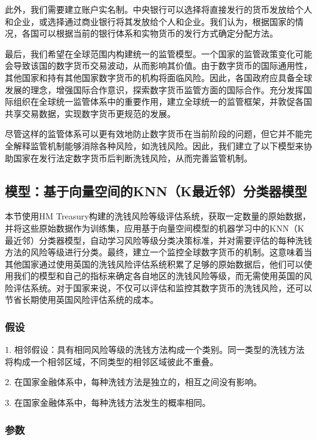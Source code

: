 \documentclass[withoutpreface,bwprint]{cumcmthesis} %
\begin{document}
此外，我们需要建立账户实名制。中央银行可以选择将直接发行的货币发放给个人和企业，或选择通过商业银行将其发放给个人和企业。我们认为，根据国家的情况，各国可以根据当前的银行体系和实物货币的发行方式确定分配方法。

最后，我们希望在全球范围内构建统一的监管模型。一个国家的监管政策变化可能会导致该国的数字货币交易波动，从而影响其价值。由于数字货币的国际通用性，其他国家和持有其他国家数字货币的机构将面临风险。因此，各国政府应具备全球发展的理念，增强国际合作意识，探索数字货币监管方面的国际合作。充分发挥国际组织在全球统一监管体系中的重要作用，建立全球统一的监管框架，并敦促各国共享交易数据，实现数字货币更规范的发展。

尽管这样的监管体系可以更有效地防止数字货币在当前阶段的问题，但它并不能完全解释监管机制能够消除各种风险，如洗钱风险。因此，我们建立了以下模型来协助国家在发行法定数字货币后判断洗钱风险，从而完善监管机制。

\subsection{模型：基于向量空间的KNN（K最近邻）分类器模型}
本节使用HM Treasury构建的洗钱风险等级评估系统，获取一定数量的原始数据，并将这些原始数据作为训练集，应用基于向量空间模型的机器学习中的KNN（K最近邻）分类器模型，自动学习风险等级分类决策标准，并对需要评估的每种洗钱方法的风险等级进行分类。最终，建立一个监控全球数字货币的机制。这意味着当其他国家通过使用英国的洗钱风险评估系统积累了足够的原始数据后，他们可以使用我们的模型和自己的指标来确定各自地区的洗钱风险等级，而无需使用英国的风险评估系统。对于国家来说，不仅可以评估和监控其数字货币的洗钱风险，还可以节省长期使用英国风险评估系统的成本。

\subsubsection{假设}
1. 相邻假设：具有相同风险等级的洗钱方法构成一个类别。同一类型的洗钱方法将构成一个相邻区域，不同类型的相邻区域彼此不重叠。

2. 在国家金融体系中，每种洗钱方法是独立的，相互之间没有影响。

3. 在国家金融体系中，每种洗钱方法发生的概率相同。

\subsubsection{参数}
\end{document}
